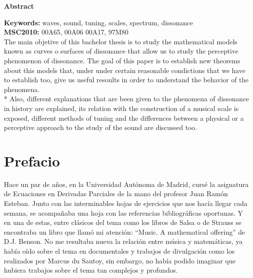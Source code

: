 \documentclass[11pt,a4paper]{article}
\begin{document}
    \vspace{2.5cm}

\vspace{3cm}
\noindent\Large{\textbf{Abstract}}\\
\normalsize

\noindent\textbf{Keywords:} waves, sound, tuning, scales, spectrum, dissonance\\

\noindent\textbf{MSC2010:} 00A65, 00A06 00A17, 97M80\\ 

The main objetive of this bachelor thesis is to study the mathematical models known as curves o surfaces of dissonance that allow us to study the perceptive phenomenon of dissonance. The goal of this paper is to establish new theorems about this models that, under under certain reasonable condictions that we have to establish too, give us useful resoults in order to understand the behavior of the phenomena.
 \\*
Also, different explanations that are been given to the phenomena of dissonance in history are explained, its relation with the construction of a musical scale is exposed, different methods of tuning and the differences between a physical or a perceptive approach to the study of the sound are discussed too.

\newpage
\clearpage\null\thispagestyle{empty}\newpage %



\tableofcontents
\newpage


{}
\section*{Prefacio}


    Hace un par de años, en la Universidad Autónoma de Madrid, cursé la asignatura de Ecuaciones en Derivadas Parciales de la mano del profesor Juan Ramón Esteban. Junto con las interminables hojas de ejercicios que nos hacía llegar cada semana, se acompañaba una hoja con las referencias bibliográficas oportunas. Y en una de estas, entre clásicos del tema como los libros de Salsa o de Strauss se encontraba un libro que llamó mi atención: ``Music. A mathematical offering'' de D.J. Benson. No me resultaba nueva la relación entre música y matemáticas, ya había oído sobre el tema en documentales y trabajos de divulgación como los realizados por Marcus du Sautoy, sin embargo, no había podido imaginar que hubiera trabajos sobre el tema tan complejos y profundos.
    
\end{document}
